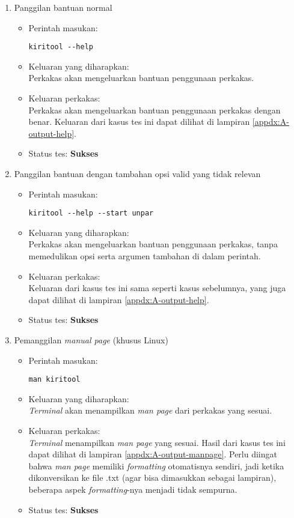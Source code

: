 \begin{enumerate}
	\item Panggilan bantuan normal
	\begin{itemize}
		\item Perintah masukan:
		\begin{lstlisting}
kiritool --help
		\end{lstlisting}
		\item Keluaran yang diharapkan: \\
		Perkakas akan mengeluarkan bantuan penggunaan perkakas.
		\item Keluaran perkakas: \\
		Perkakas akan mengeluarkan bantuan penggunaan perkakas dengan benar. Keluaran dari kasus tes ini dapat dilihat di lampiran \ref{appdx:A-output-help}.
		\item Status tes: \textbf{Sukses}
	\end{itemize}
	
	\item Panggilan bantuan dengan tambahan opsi valid yang tidak relevan
	\begin{itemize}
		\item Perintah masukan:
		\begin{lstlisting}
kiritool --help --start unpar
		\end{lstlisting}
		\item Keluaran yang diharapkan: \\
		Perkakas akan mengeluarkan bantuan penggunaan perkakas, tanpa memedulikan opsi serta argumen tambahan di dalam perintah.
		\item Keluaran perkakas: \\
		Keluaran dari kasus tes ini sama seperti kasus sebelumnya, yang juga dapat dilihat di lampiran \ref{appdx:A-output-help}.
		\item Status tes: \textbf{Sukses}
	\end{itemize}
	
	\item Pemanggilan \textit{manual page} (khusus Linux)
	\begin{itemize}
		\item Perintah masukan:
		\begin{lstlisting}
man kiritool
		\end{lstlisting}
		\item Keluaran yang diharapkan: \\
		\textit{Terminal} akan menampilkan \textit{man page} dari perkakas yang sesuai.
		\item Keluaran perkakas: \\
		\textit{Terminal} menampilkan \textit{man page} yang sesuai. Hasil dari kasus tes ini dapat dilihat di lampiran \ref{appdx:A-output-manpage}. Perlu diingat bahwa \textit{man page} memiliki \textit{formatting} otomatisnya sendiri, jadi ketika dikonversikan ke file .txt (agar bisa dimasukkan sebagai lampiran), beberapa aspek \textit{formatting}-nya menjadi tidak sempurna.
		\item Status tes: \textbf{Sukses}
	\end{itemize}
	

\end{enumerate}
